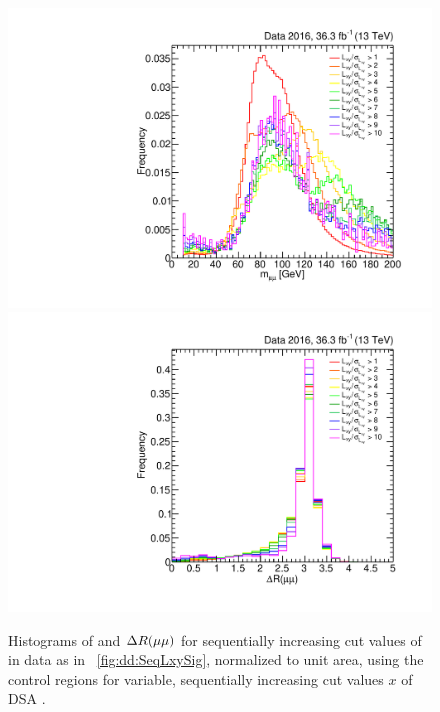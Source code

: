 \begin{figure}[p]
  \centering
  \includegraphics[width=\DSquareWidth]{figures/displaced/BGEST_EffectOfLxySigCut_Mass_Data_DY-Like.pdf}
  \hspace*{-2em}
  \includegraphics[width=\DSquareWidth]{figures/displaced/BGEST_EffectOfLxySigCut_DeltaR_Data_DY-Like.pdf}
  \caption[Histograms of \mMuMu and $\deltaR(\Pgm\Pgm)$ for \mbox{Drell-Yan}-like events in data for sequentially increasing cut values of \LxySig.]{Histograms of  \mMuMu and  $\deltaR(\Pgm\Pgm)$ for sequentially increasing cut values of \LxySig in data as in \Fig~\ref{fig:dd:SeqLxySig}, normalized to unit area, using the control regions  for variable, sequentially increasing cut values $x$ of DSA \LxySig.}
  \label{fig:dd:SeqLxySig_DY_MassDeltaR}
\end{figure}


